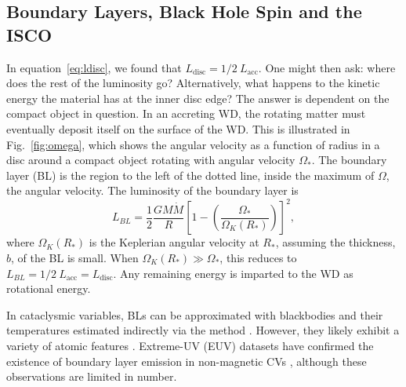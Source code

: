 \subsection{Boundary Layers, Black Hole Spin and the ISCO}
\label{sec:bl_isco}
In equation~\ref{eq:ldisc}, we found that $L_{\mathrm{disc}} = 1/2~L_{\mathrm{acc}}$. 
One might then ask: where does the rest of the luminosity go? Alternatively, 
what happens to the kinetic energy the material has at the inner disc edge?
The answer is dependent on the compact object in question. 
In an accreting WD, the rotating matter must eventually deposit itself 
on the surface of the WD. This is illustrated in Fig.~\ref{fig:omega},
which shows the angular velocity as a function of radius in a disc around
a compact object rotating with angular velocity $\Omega_*$. The boundary layer (BL)
is the region to the left of the dotted line, inside the maximum of $\Omega$, the
angular velocity. The luminosity of the boundary layer is \citep{fkrbook}
\begin{equation}
L_{BL} = \frac{1}{2}\frac{GM \dot{M}}{R} \left[1 - \left(\frac{\Omega_*}{\Omega_K(R_*)}\right)\right]^2,
\end{equation}
where $\Omega_K(R_*)$ is the Keplerian angular velocity at $R_*$, 
assuming the thickness, $b$, of the BL is small. 
When $\Omega_K(R_*) \gg {\Omega_*}$, this reduces to 
$L_{BL} = 1/2~L_{\mathrm{acc}} = L_{\mathrm{disc}}$. Any remaining energy
is imparted to the WD as rotational energy.

In cataclysmic variables, 
BLs can be approximated with blackbodies and their temperatures estimated
indirectly via the \cite{zanstra1929} method \citep[e.g.][]{hoare1991,hoaredrew1993}.
However, they likely exhibit a variety of atomic features \citep{suleimanov2014}.
Extreme-UV (EUV) datasets have confirmed the existence of boundary layer emission
in non-magnetic CVs \citep{mauche1996}, although these observations
are limited in number.

